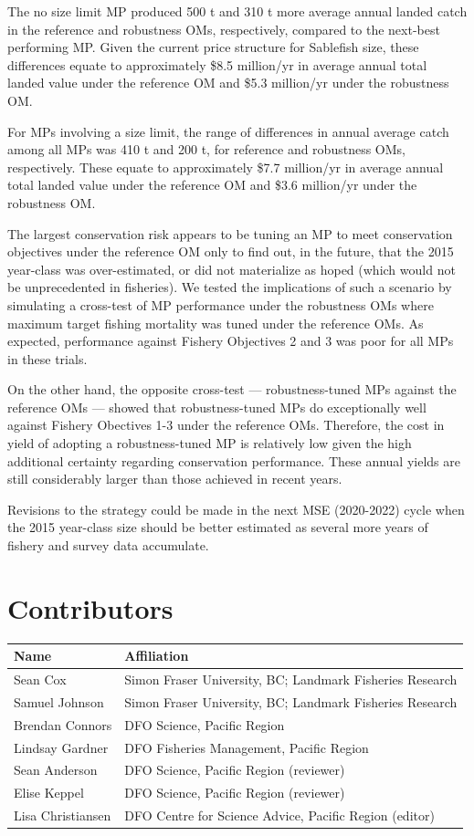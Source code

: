 \documentclass[11pt]{book}
\begin{document}
The no size limit MP produced 500 t and 310 t more average annual landed catch in the reference and robustness OMs, respectively, compared to the next-best performing MP. Given the current price structure for Sablefish size, these differences equate to approximately \$8.5 million/yr in average annual total landed value under the reference OM and \$5.3 million/yr under the robustness OM.

For MPs involving a size limit, the range of differences in annual average catch among all MPs was 410 t and 200 t, for reference and robustness OMs, respectively. These equate to approximately \$7.7 million/yr in average annual total landed value under the reference OM and \$3.6 million/yr under the robustness OM.

The largest conservation risk appears to be tuning an MP to meet conservation objectives under the reference OM only to find out, in the future, that the 2015 year-class was over-estimated, or did not materialize as hoped (which would not be unprecedented in fisheries). We tested the implications of such a scenario by simulating a cross-test of MP performance under the robustness OMs where maximum target fishing mortality was tuned under the reference OMs. As expected, performance against Fishery Objectives 2 and 3 was poor for all MPs in these trials.

On the other hand, the opposite cross-test --- robustness-tuned MPs against the reference OMs --- showed that robustness-tuned MPs do exceptionally well against Fishery Obectives 1-3 under the reference OMs. Therefore, the cost in yield of adopting a robustness-tuned MP is relatively low given the high additional certainty regarding conservation performance. These annual yields are still considerably larger than those achieved in recent years.

Revisions to the strategy could be made in the next MSE (2020-2022) cycle when the 2015 year-class size should be better estimated as several more years of fishery and survey data accumulate.

\hypertarget{contributors}{%
\section{Contributors}\label{contributors}}
\begin{longtable}[]{@{}ll@{}}
\toprule
Name & Affiliation\tabularnewline
\midrule
\endhead
Sean Cox & Simon Fraser University, BC; Landmark Fisheries Research\tabularnewline
Samuel Johnson & Simon Fraser University, BC; Landmark Fisheries Research\tabularnewline
Brendan Connors & DFO Science, Pacific Region\tabularnewline
Lindsay Gardner & DFO Fisheries Management, Pacific Region\tabularnewline
Sean Anderson & DFO Science, Pacific Region (reviewer)\tabularnewline
Elise Keppel & DFO Science, Pacific Region (reviewer)\tabularnewline
Lisa Christiansen & DFO Centre for Science Advice, Pacific Region (editor)\tabularnewline
\bottomrule
\end{longtable}
\MakeApproval
\end{document}
